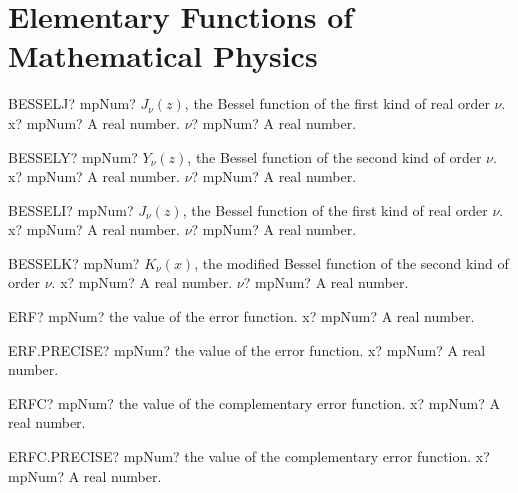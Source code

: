 \documentclass[12pt,a4paper,openany]{book}
\begin{document}
\section{Elementary Functions of Mathematical Physics}

\begin{mpFunctionsExtract}
\mpWorksheetFunctionTwoNotImplemented
{BESSELJ? mpNum? $J_{\nu}(z)$, the Bessel function of the first kind of real order $\nu$.}
{x? mpNum? A real number.}
{$\nu$? mpNum? A real number.}
\end{mpFunctionsExtract}

\begin{mpFunctionsExtract}
\mpWorksheetFunctionTwoNotImplemented
{BESSELY? mpNum? $Y_{\nu}(z)$, the Bessel function of the second kind of order $\nu$.}
{x? mpNum? A real number.}
{$\nu$? mpNum? A real number.}
\end{mpFunctionsExtract}

\begin{mpFunctionsExtract}
\mpWorksheetFunctionTwoNotImplemented
{BESSELI? mpNum? $J_{\nu}(z)$, the Bessel function of the first kind of real order $\nu$.}
{x? mpNum? A real number.}
{$\nu$? mpNum? A real number.}
\end{mpFunctionsExtract}

\begin{mpFunctionsExtract}
\mpWorksheetFunctionTwoNotImplemented
{BESSELK? mpNum?  $K_{\nu}(x)$, the modified Bessel function of the second kind of order $\nu$.}
{x? mpNum? A real number.}
{$\nu$? mpNum? A real number.}
\end{mpFunctionsExtract}

\begin{mpFunctionsExtract}
\mpWorksheetFunctionOneNotImplemented
{ERF? mpNum? the value of the error function.}
{x? mpNum? A real number.}
\end{mpFunctionsExtract}

\begin{mpFunctionsExtract}
\mpWorksheetFunctionOneNotImplemented
{ERF.PRECISE? mpNum? the value of the error function.}
{x? mpNum? A real number.}
\end{mpFunctionsExtract}

\begin{mpFunctionsExtract}
\mpWorksheetFunctionOneNotImplemented
{ERFC? mpNum? the value of the complementary error function.}
{x? mpNum? A real number.}
\end{mpFunctionsExtract}

\begin{mpFunctionsExtract}
\mpWorksheetFunctionOneNotImplemented
{ERFC.PRECISE? mpNum? the value of the complementary error function.}
{x? mpNum? A real number.}
\end{mpFunctionsExtract}
\end{document}
